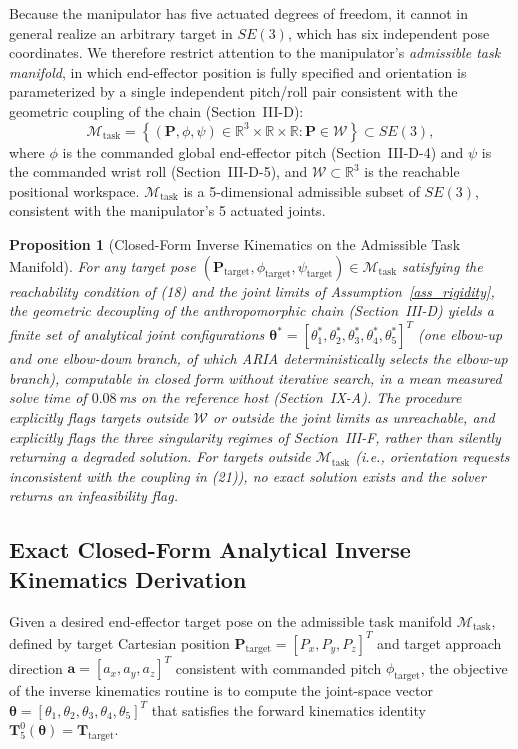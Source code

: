 \documentclass[journal]{IEEEtran}
\newtheorem{proposition}{Proposition}
\begin{document}
Because the manipulator has five actuated degrees of freedom, it cannot in general realize an arbitrary target in $SE(3)$, which has six independent pose coordinates. We therefore restrict attention to the manipulator's \emph{admissible task manifold}, in which end-effector position is fully specified and orientation is parameterized by a single independent pitch/roll pair consistent with the geometric coupling of the chain (Section~III-D):
\begin{equation}
\mathcal{M}_{\text{task}} = \left\{ (\mathbf{P}, \phi, \psi) \in \mathbb{R}^3 \times \mathbb{R} \times \mathbb{R} : \mathbf{P}\in\mathcal{W} \right\} \subset SE(3),
\end{equation}
where $\phi$ is the commanded global end-effector pitch (Section~III-D-4) and $\psi$ is the commanded wrist roll (Section~III-D-5), and $\mathcal{W}\subset\mathbb{R}^3$ is the reachable positional workspace. $\mathcal{M}_{\text{task}}$ is a 5-dimensional admissible subset of $SE(3)$, consistent with the manipulator's 5 actuated joints.

\begin{proposition}[Closed-Form Inverse Kinematics on the Admissible Task Manifold]
\label{prop_ik}
For any target pose $(\mathbf{P}_{\text{target}}, \phi_{\text{target}}, \psi_{\text{target}}) \in \mathcal{M}_{\text{task}}$ satisfying the reachability condition of (18) and the joint limits of Assumption~\ref{ass_rigidity}, the geometric decoupling of the anthropomorphic chain (Section~III-D) yields a finite set of analytical joint configurations $\boldsymbol{\theta}^* = [\theta_1^*, \theta_2^*, \theta_3^*, \theta_4^*, \theta_5^*]^T$ (one elbow-up and one elbow-down branch, of which ARIA deterministically selects the elbow-up branch), computable in closed form without iterative search, in a mean measured solve time of $0.08$\,ms on the reference host (Section~IX-A). The procedure explicitly flags targets outside $\mathcal{W}$ or outside the joint limits as unreachable, and explicitly flags the three singularity regimes of Section~III-F, rather than silently returning a degraded solution. For targets outside $\mathcal{M}_{\text{task}}$ (i.e., orientation requests inconsistent with the coupling in (21)), no exact solution exists and the solver returns an infeasibility flag.
\end{proposition}

\subsection{Exact Closed-Form Analytical Inverse Kinematics Derivation}
Given a desired end-effector target pose on the admissible task manifold $\mathcal{M}_{\text{task}}$, defined by target Cartesian position $\mathbf{P}_{\text{target}} = [P_x, P_y, P_z]^T$ and target approach direction $\mathbf{a} = [a_x, a_y, a_z]^T$ consistent with commanded pitch $\phi_{\text{target}}$, the objective of the inverse kinematics routine is to compute the joint-space vector $\boldsymbol{\theta} = [\theta_1, \theta_2, \theta_3, \theta_4, \theta_5]^T$ that satisfies the forward kinematics identity $\mathbf{T}_5^0(\boldsymbol{\theta}) = \mathbf{T}_{\text{target}}$.
\end{document}
